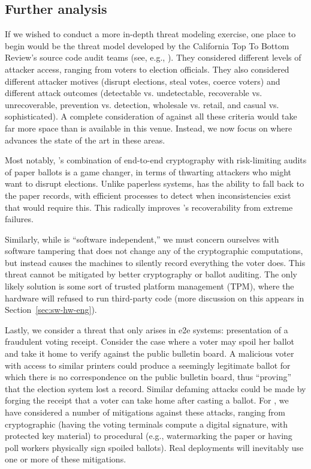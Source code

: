\subsection{Further analysis}

If we wished to conduct a more in-depth threat modeling exercise, one place to begin would be
the threat model developed by the California Top To Bottom Review's source code audit teams (see, e.g., \cite{ca-hart-src07}). They considered different levels of attacker access, ranging from voters to election officials. They also considered different attacker motives (disrupt elections, steal votes, coerce voters) and different attack outcomes (detectable vs. undetectable, recoverable vs. unrecoverable, prevention vs. detection, wholesale vs. retail, and casual vs. sophisticated). A complete consideration of \projname against all these criteria would take far more space than is available in this venue. Instead, we now focus on where \projname advances the state of the art in these areas.

Most notably, \projname's combination of end-to-end cryptography with risk-limiting audits of paper ballots is a game changer, in terms of thwarting attackers who might want to disrupt elections. Unlike paperless systems, \projname has the ability to fall back to the paper records, with efficient processes to detect when inconsistencies exist that would require this. This radically improves \projname's recoverability from extreme failures.

Similarly, while \projname is ``software independent,'' we must concern ourselves with software tampering that does not change any of the cryptographic computations, but instead causes the \projname machines to silently record everything the voter does. This threat cannot be mitigated by better cryptography or ballot auditing. The only likely solution is some sort of trusted platform management (TPM), where the hardware will refused to run third-party code (more discussion on this appears in Section~\ref{sec:sw-hw-eng}).

Lastly, we consider a threat that only arises in e2e systems: presentation of a fraudulent voting receipt. Consider the case where a voter may spoil her ballot and take it home to verify against the public bulletin board. A malicious voter with access to similar printers could produce a seemingly legitimate ballot for which there is no correspondence on the public bulletin board, thus ``proving'' that the election system lost a record. Similar defaming attacks could be made by forging the receipt that a voter can take home after casting a ballot. For \projname, we have considered a number of mitigations against these attacks, ranging from cryptographic (having the voting terminals compute a digital signature, with protected key material) to procedural (e.g., watermarking the paper or having poll workers physically sign spoiled ballots). Real \projname deployments will inevitably use one or more of these mitigations.

